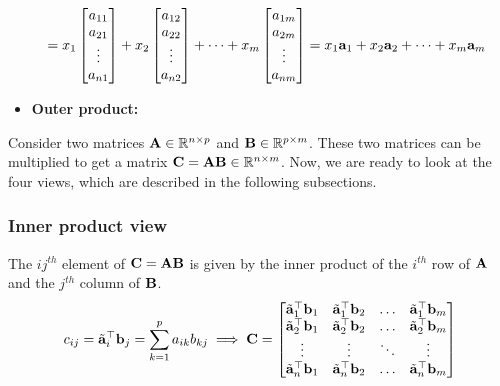 \begin{itemize}
\[\begin{split}
        &= x_1 \bmxc a_{11} \\ a_{21} \\ \vdots \\ a_{n1}\emx + x_2 \bmxc a_{12} \\ a_{22} \\ \vdots \\ a_{n2}\emx + \cdots + x_m\bmxc a_{1m} \\ a_{2m} \\ \vdots \\ a_{nm} \emx = x_1 \mf{a}_1 + x_2 \mf{a}_2 + \cdots + x_m\mf{a}_m
    \end{split} \]

    \item \textbf{Outer product:}
\end{itemize}


Consider two matrices $\mathbf{A} \in \mathbb{R}^{n \times p}$ and $\mathbf{B} \in \mathbb{R}^{p \times m}$. These two matrices can be multiplied to get a matrix $\mathbf{C} = \mathbf{A}\mathbf{B} \in \mathbb{R}^{n \times m}$. Now, we are ready to look at the four views, which are described in the following subsections. 

\subsubsection{Inner product view}
The $ij^{th}$ element of $\mathbf{C} = \mathbf{A}\mathbf{B}$ is given by the inner product of the $i^{th}$ row of $\mathbf{A}$ and the $j^{th}$ column of $\mathbf{B}$.
\begin{equation}
    c_{ij} = \tilde{\mf{a}}_i^\top \mf{b}_j = \sum_{k=1}^{p} a_{ik}b_{kj} \implies \mf{C} = \bmxc \tilde{\mf{a}}_1^\top\mf{b}_1 & \tilde{\mf{a}}_1^\top\mf{b}_2 & \ldots & \tilde{\mf{a}}_1^\top\mf{b}_m \\
    \tilde{\mf{a}}_2^\top\mf{b}_1 & \tilde{\mf{a}}_2^\top\mf{b}_2 & \ldots & \tilde{\mf{a}}_2^\top\mf{b}_m \\
    \vdots & \vdots & \ddots & \vdots \\
    \tilde{\mf{a}}_n^\top\mf{b}_1 & \tilde{\mf{a}}_n^\top\mf{b}_2 & \ldots & \tilde{\mf{a}}_n^\top\mf{b}_m
    \emx
    \label{eq:ch02-mat-mult-inner-prod}
\end{equation}

